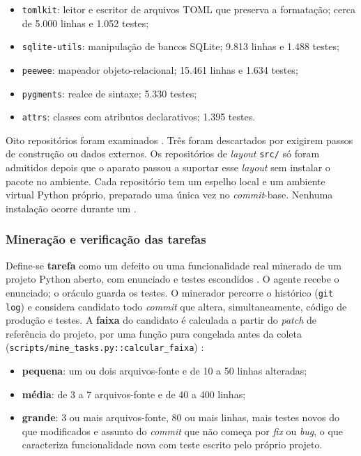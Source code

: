 \begin{itemize}
    \item \texttt{tomlkit}: leitor e escritor de arquivos TOML que preserva a formatação; cerca de 5.000 linhas e 1.052 testes;
    \item \texttt{sqlite-utils}: manipulação de bancos SQLite; 9.813 linhas e 1.488 testes;
    \item \texttt{peewee}: mapeador objeto-relacional; 15.461 linhas e 1.634 testes;
    \item \texttt{pygments}: realce de sintaxe; 5.330 testes;
    \item \texttt{attrs}: classes com atributos declarativos; 1.395 testes.
\end{itemize}

Oito repositórios foram examinados . Três foram descartados por exigirem passos de construção ou dados externos. Os repositórios de \textit{layout} \texttt{src/} só foram admitidos depois que o aparato passou a suportar esse \textit{layout} sem instalar o pacote no ambiente. Cada repositório tem um espelho local e um ambiente virtual Python próprio, preparado uma única vez no \textit{commit}-base. Nenhuma instalação ocorre durante um . 

\subsubsection{Mineração e verificação das tarefas}

Define-se \textbf{tarefa} como um defeito ou uma funcionalidade real minerado de um projeto Python aberto, com enunciado e testes escondidos . O agente recebe o enunciado; o oráculo guarda os testes. O minerador percorre o histórico (\texttt{git log}) e considera candidato todo \textit{commit} que altera, simultaneamente, código de produção e testes. A \textbf{faixa} do candidato é calculada a partir do \textit{patch} de referência do projeto, por uma função pura congelada antes da coleta (\texttt{scripts/mine\_tasks.py::calcular\_faixa}) :

\begin{itemize}
    \item \textbf{pequena}: um ou dois arquivos-fonte e de 10 a 50 linhas alteradas;
    \item \textbf{média}: de 3 a 7 arquivos-fonte e de 40 a 400 linhas;
    \item \textbf{grande}: 3 ou mais arquivos-fonte, 80 ou mais linhas, mais testes novos do que modificados e assunto do \textit{commit} que não começa por \textit{fix} ou \textit{bug}, o que caracteriza funcionalidade nova com teste escrito pelo próprio projeto.
\end{itemize}

